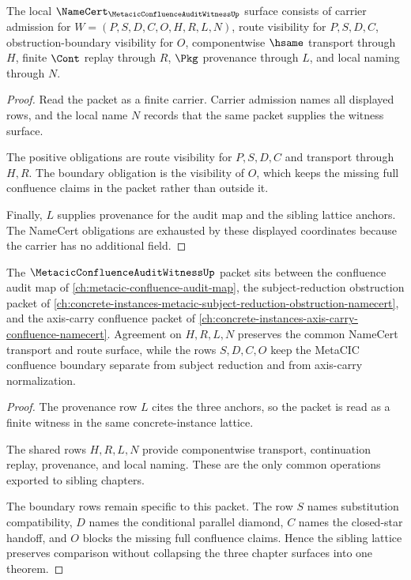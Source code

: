 \begin{theorem}
\label{thm:metacic-confluence-audit-witness-namecert-obligations}
The local $\NameCert_{\MetacicConfluenceAuditWitnessUp}$ surface consists of carrier admission for $W=(P,S,D,C,O,H,R,L,N)$, route visibility for $P,S,D,C$, obstruction-boundary visibility for $O$, componentwise $\hsame$ transport through $H$, finite $\Cont$ replay through $R$, $\Pkg$ provenance through $L$, and local naming through $N$.
\end{theorem}
\begin{proof}
Read the packet as a finite carrier. Carrier admission names all displayed rows, and the local name $N$ records that the same packet supplies the witness surface.

The positive obligations are route visibility for $P,S,D,C$ and transport through $H,R$. The boundary obligation is the visibility of $O$, which keeps the missing full confluence claims in the packet rather than outside it.

Finally, $L$ supplies provenance for the audit map and the sibling lattice anchors. The NameCert obligations are exhausted by these displayed coordinates because the carrier has no additional field.
\end{proof}

\begin{theorem}
\label{thm:metacic-confluence-audit-witness-sibling-lattice}
The $\MetacicConfluenceAuditWitnessUp$ packet sits between the confluence audit map of \autoref{ch:metacic-confluence-audit-map}, the subject-reduction obstruction packet of \autoref{ch:concrete-instances-metacic-subject-reduction-obstruction-namecert}, and the axis-carry confluence packet of \autoref{ch:concrete-instances-axis-carry-confluence-namecert}. Agreement on $H,R,L,N$ preserves the common NameCert transport and route surface, while the rows $S,D,C,O$ keep the MetaCIC confluence boundary separate from subject reduction and from axis-carry normalization.
\end{theorem}
\begin{proof}
The provenance row $L$ cites the three anchors, so the packet is read as a finite witness in the same concrete-instance lattice.

The shared rows $H,R,L,N$ provide componentwise transport, continuation replay, provenance, and local naming. These are the only common operations exported to sibling chapters.

The boundary rows remain specific to this packet. The row $S$ names substitution compatibility, $D$ names the conditional parallel diamond, $C$ names the closed-star handoff, and $O$ blocks the missing full confluence claims. Hence the sibling lattice preserves comparison without collapsing the three chapter surfaces into one theorem.
\end{proof}

